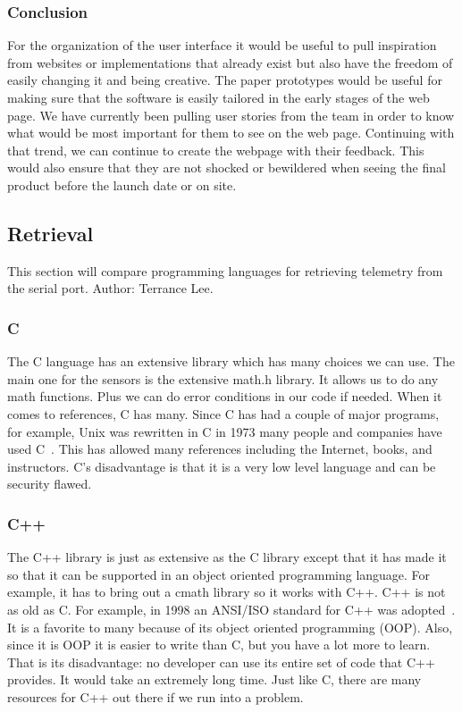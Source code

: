 \documentclass[10pt,draftclsnofoot,onecolumn]{IEEEtran}
\begin{document}
	\subsubsection{Conclusion}
	For the organization of the user interface it would be useful to pull inspiration from websites or implementations
	that already exist but also have the freedom of easily changing it and being creative. 
	The paper prototypes would be useful for making sure that the software is easily tailored in the early stages of the 
	web page. 
	We have currently been pulling user stories from the team in order to know what would be most important for them to 
	see on the web page. 
	Continuing with that trend, we can continue to create the webpage with their feedback. 
	This would also ensure that they are not shocked or bewildered when seeing the final product before the launch date
	or on site.
	
	\subsection{Retrieval}
	This section will compare programming languages for retrieving telemetry from the serial port. Author: Terrance Lee.
   	\subsubsection{C}
   	The C language has an extensive library which has many choices we can use. 
	The main one for the sensors is the extensive math.h library. 
	It allows us to do any math functions. Plus we can do error conditions in our code if needed. 
	When it comes to references, C has many. 
	Since C has had a couple of major programs, for example, Unix was rewritten in C in 1973 many people and companies have
	used C~\cite{history-of-unix-part-i}.
	This has allowed many references including the Internet, books, and instructors. C's disadvantage is that it is a very low level language and can be security flawed.

	\subsubsection{C++}
   	The C++ library is just as extensive as the C library except that it has made it so that it can be supported in an
	object oriented programming language. 
	For example, it has to bring out a cmath library so it works with C++.
	C++ is not as old as C. For example, in 1998 an ANSI/ISO standard for C++ was adopted~\cite{c-programmers-reference}.
	It is a favorite to many because of its object oriented programming (OOP). 
	Also, since it is OOP it is easier to write than C, but you have a lot more to learn. 
	That is its disadvantage: no developer can use its entire set of code that C++ provides.
	It would take an extremely long time. Just like C, there are many resources for C++ out there if we run into a problem.
\end{document}
